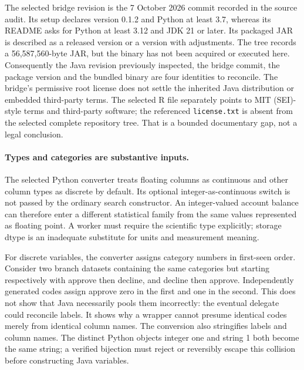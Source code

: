 The selected bridge revision is the 7 October 2026 commit recorded in the
source audit. Its setup declares version 0.1.2 and Python at least 3.7, whereas
its README asks for Python at least 3.12 and JDK 21 or later. Its packaged JAR
is described as a released version or a version with adjustments. The tree
records a 56,587,560-byte JAR, but the binary has not been acquired or executed
here. Consequently the Java revision previously inspected, the bridge commit,
the package version and the bundled binary are four identities to reconcile.
The bridge's permissive root license does not settle the inherited Java
distribution or embedded third-party terms. The selected R file separately
points to MIT (SEI)-style terms and third-party software; the referenced
\texttt{license.txt} is absent from the selected complete repository tree.
That is a bounded documentary gap, not a legal conclusion.
\citep{exec24_pytetrad_source,exec13_tetrad_reuse_primary}

\paragraph{Types and categories are substantive inputs.}
The selected Python converter treats floating columns as continuous and other
column types as discrete by default. Its optional integer-as-continuous switch
is not passed by the ordinary search constructor. An integer-valued account
balance can therefore enter a different statistical family from the same
values represented as floating point. A worker must require the scientific
type explicitly; storage dtype is an inadequate substitute for units and
measurement meaning.~\citep{exec24_pytetrad_source}

For discrete variables, the converter assigns category numbers in first-seen
order. Consider two branch datasets containing the same categories but starting
respectively with approve then decline, and decline then approve. Independently
generated codes assign approve zero in the first and one in the second. This
does not show that Java necessarily pools them incorrectly: the eventual
delegate could reconcile labels. It shows why a wrapper cannot presume identical
codes merely from identical column names. The conversion also stringifies labels
and column names. The distinct Python objects integer one and string 1
both become the same string; a verified bijection must reject or reversibly
escape this collision before constructing Java variables.
\citep{exec24_pytetrad_source,exec24_pytetrad_choice}

